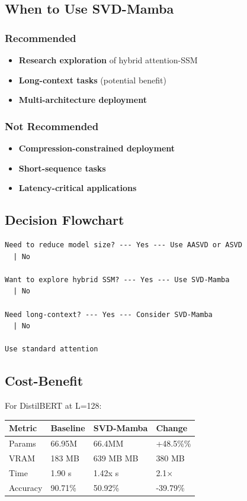 \subsection{When to Use SVD-Mamba}

\subsubsection{Recommended}

\begin{itemize}
\item \textbf{Research exploration} of hybrid attention-SSM
\item \textbf{Long-context tasks} (potential benefit)
\item \textbf{Multi-architecture deployment}

\end{itemize}
\subsubsection{Not Recommended}

\begin{itemize}
\item \textbf{Compression-constrained deployment}
\item \textbf{Short-sequence tasks}
\item \textbf{Latency-critical applications}

\end{itemize}
\subsection{Decision Flowchart}

\begin{lstlisting}
Need to reduce model size? --- Yes --- Use AASVD or ASVD
  | No
   
Want to explore hybrid SSM? --- Yes --- Use SVD-Mamba
  | No
   
Need long-context? --- Yes --- Consider SVD-Mamba
  | No
   
Use standard attention
\end{lstlisting}

\subsection{Cost-Benefit}

For DistilBERT at L=128:

\begin{table}[H]
\centering
\small
\begin{tabular}{llll}
\toprule
\textbf{Metric} & \textbf{Baseline} & \textbf{SVD-Mamba} & \textbf{Change} \\
\midrule
Params & 66.95M & 66.4MM & +48.5\%\% \\
VRAM & 183 MB & 639 MB MB & 380 MB \\
Time & 1.90 s & 1.42x s & 2.1$\times$ \\
Accuracy & 90.71\% & 50.92\% & -39.79\% \\
\bottomrule
\end{tabular}
\end{table}

